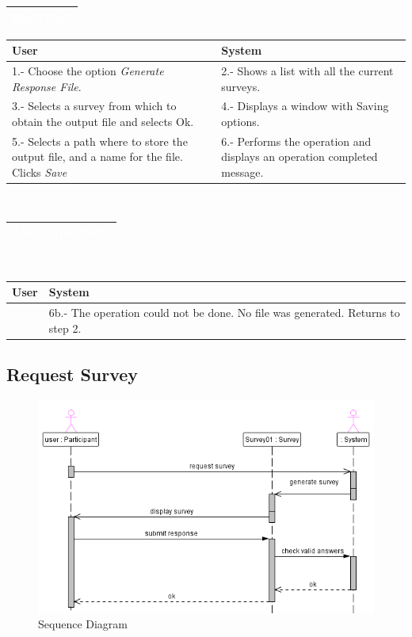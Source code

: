 \begin{tabular}{|p{13.8cm}|}\hline
  \rowcolor[rgb]{.3,.4,.9}\textcolor{white}{{\bf Basic Path}} \\\hline
\end{tabular}

\begin{tabular}[]{|p{6.7cm}|p{6.7cm}|}\hline
  \rowcolor[gray]{0.9} User & System \\\hline
  1.- Choose the option {\it Generate Response File}. & 2.- Shows a list with all the current surveys. \\\hline
  3.- Selects a survey from which to obtain the output file and selects Ok. & 4.- Displays a window with Saving options. \\\hline
  5.- Selects a path where to store the output file, and a name for the file. Clicks {\it Save} & 6.- Performs the operation and displays an operation completed message.\\\hline
\end{tabular}\\ 

\begin{tabular}[]{|p{13.8cm}|}\hline
  \rowcolor[rgb]{.3,.4,.9}\textcolor{white}{{\bf Alternative Paths }} \\\hline
\end{tabular}\\ 

\begin{tabular}[]{|p{6.7cm}|p{6.7cm}|}\hline
  \rowcolor[gray]{0.9} User & System \\\hline
  & 6b.- The operation could not be done. No file was generated. Returns to step 2. \\\hline
\end{tabular}

\subsection{Request Survey }
\label{request}

\begin{figure}[h!]
  \begin{center}
   \includegraphics[width=15cm]{pics/Sequence.png}
  \end{center}
 \caption{Sequence Diagram}
\end{figure}

